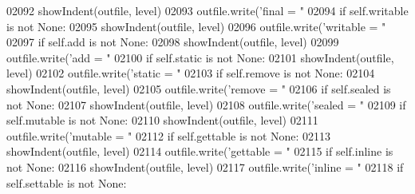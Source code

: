 \begin{DoxyCode}
{{{{{{{{{{{{{{{{{{{{{{{{{{{{{{{{{{{{{{{{{{{{{{{{{{{{{{{{{{{{{{{{{{{{{{{{{{{{{{{{{{{{{{{{{{{{{{{{{{{{{{{{{{{{{{{{{{{{{{{{{{{{{{{{{{{{{{{{{{{{{{{{{{{{{{{{{02092             showIndent(outfile, level)
02093             outfile.write(\textcolor{stringliteral}{'final = "%
02094         \textcolor{keywordflow}{if} self.writable \textcolor{keywordflow}{is} \textcolor{keywordflow}{not} \textcolor{keywordtype}{None}:
02095             showIndent(outfile, level)
02096             outfile.write(\textcolor{stringliteral}{'writable = "%
02097         \textcolor{keywordflow}{if} self.add \textcolor{keywordflow}{is} \textcolor{keywordflow}{not} \textcolor{keywordtype}{None}:
02098             showIndent(outfile, level)
02099             outfile.write(\textcolor{stringliteral}{'add = "%
02100         \textcolor{keywordflow}{if} self.static \textcolor{keywordflow}{is} \textcolor{keywordflow}{not} \textcolor{keywordtype}{None}:
02101             showIndent(outfile, level)
02102             outfile.write(\textcolor{stringliteral}{'static = "%
02103         \textcolor{keywordflow}{if} self.remove \textcolor{keywordflow}{is} \textcolor{keywordflow}{not} \textcolor{keywordtype}{None}:
02104             showIndent(outfile, level)
02105             outfile.write(\textcolor{stringliteral}{'remove = "%
02106         \textcolor{keywordflow}{if} self.sealed \textcolor{keywordflow}{is} \textcolor{keywordflow}{not} \textcolor{keywordtype}{None}:
02107             showIndent(outfile, level)
02108             outfile.write(\textcolor{stringliteral}{'sealed = "%
02109         \textcolor{keywordflow}{if} self.mutable \textcolor{keywordflow}{is} \textcolor{keywordflow}{not} \textcolor{keywordtype}{None}:
02110             showIndent(outfile, level)
02111             outfile.write(\textcolor{stringliteral}{'mutable = "%
02112         \textcolor{keywordflow}{if} self.gettable \textcolor{keywordflow}{is} \textcolor{keywordflow}{not} \textcolor{keywordtype}{None}:
02113             showIndent(outfile, level)
02114             outfile.write(\textcolor{stringliteral}{'gettable = "%
02115         \textcolor{keywordflow}{if} self.inline \textcolor{keywordflow}{is} \textcolor{keywordflow}{not} \textcolor{keywordtype}{None}:
02116             showIndent(outfile, level)
02117             outfile.write(\textcolor{stringliteral}{'inline = "%
02118         \textcolor{keywordflow}{if} self.settable \textcolor{keywordflow}{is} \textcolor{keywordflow}{not} \textcolor{keywordtype}{None}:
}}}}}}}}}}}}}}}}}}}}}}}}}}}}}}}}}}}}}}}}}}}}}}}}}}}}}}}}}}}}}}}}}}}}}}}}}}}}}}}}}}}}}}}}}}}}}}}}}}}}}}}}}}}}}}}}}}}}}}}}}}}}}}}}}}}}}}}}}}}}}}}}}}}}}}}}}}}}}}}}}}
\end{DoxyCode}
